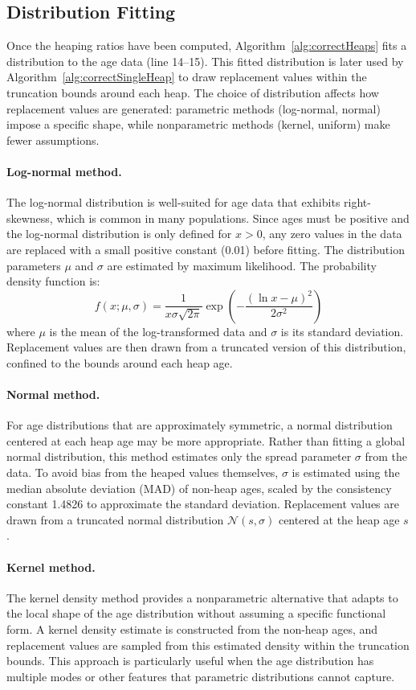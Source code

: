 \documentclass[12pt]{article}
\theoremstyle{plain}
\theoremstyle{definition}
\begin{document}
\subsection{Distribution Fitting}\label{sec:distfit}

Once the heaping ratios have been computed, Algorithm~\ref{alg:correctHeaps} fits a distribution to the age data (line 14--15). This fitted distribution is later used by Algorithm~\ref{alg:correctSingleHeap} to draw replacement values within the truncation bounds around each heap. The choice of distribution affects how replacement values are generated: parametric methods (log-normal, normal) impose a specific shape, while nonparametric methods (kernel, uniform) make fewer assumptions.

\paragraph{Log-normal method.} The log-normal distribution is well-suited for age data that exhibits right-skewness, which is common in many populations. Since ages must be positive and the log-normal distribution is only defined for $x > 0$, any zero values in the data are replaced with a small positive constant (0.01) before fitting. The distribution parameters $\mu$ and $\sigma$ are estimated by maximum likelihood. The probability density function is:
\[
f(x; \mu, \sigma) = \frac{1}{x\sigma\sqrt{2\pi}} \exp\left(-\frac{(\ln x - \mu)^2}{2\sigma^2}\right)
\]
where $\mu$ is the mean of the log-transformed data and $\sigma$ is its standard deviation. Replacement values are then drawn from a truncated version of this distribution, confined to the bounds around each heap age.

\paragraph{Normal method.} For age distributions that are approximately symmetric, a normal distribution centered at each heap age may be more appropriate. Rather than fitting a global normal distribution, this method estimates only the spread parameter $\sigma$ from the data. To avoid bias from the heaped values themselves, $\sigma$ is estimated using the median absolute deviation (MAD) of non-heap ages, scaled by the consistency constant 1.4826 to approximate the standard deviation. Replacement values are drawn from a truncated normal distribution $\mathcal{N}(s, \sigma)$ centered at the heap age $s$.

\paragraph{Kernel method.} The kernel density method provides a nonparametric alternative that adapts to the local shape of the age distribution without assuming a specific functional form. A kernel density estimate is constructed from the non-heap ages, and replacement values are sampled from this estimated density within the truncation bounds. This approach is particularly useful when the age distribution has multiple modes or other features that parametric distributions cannot capture.
\end{document}
